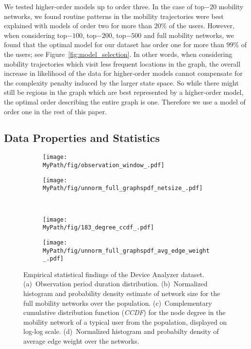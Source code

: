 We tested higher-order models up to order three.
In the case of top$-20$ mobility networks, we found routine patterns in the mobility trajectories were best explained with models of order two for more than 20$\%$ of the users.
However, when considering top$-100$, top$-200$, top$-500$ and full mobility networks, we found that the optimal model for our dataset has order one for more than $ 99\% $ of the users; see Figure~\ref{fig:model_selection}.
In other words, when considering mobility trajectories which visit less frequent locations in the graph, the overall increase in likelihood of the data for higher-order models cannot compensate for the complexity penalty induced by the larger state space.
So while there might still be regions in the graph which are best represented by a higher-order model, the optimal order describing the entire graph is one.
Therefore we use a model of order one in the rest of this paper.




\subsection{Data Properties and Statistics \label{sec:data-stats}}

\begin{figure*}[!t]
	\centering
	\begin{subfigure}[!t]{0.47\textwidth}
		\centering		\texttt{[image: \\MyPath/fig/observation\_window\_.pdf]}
		\caption{}
		\label{fig:num_of_days}
	\end{subfigure}%
	\begin{subfigure}[!t]{.47\textwidth}
		\centering
		\texttt{[image: \\MyPath/fig/unnorm\_full\_graphspdf\_netsize\_.pdf]}
		\caption{}
		\label{fig:sizes}
	\end{subfigure}%
	\\
	\begin{subfigure}[!t]{0.47\textwidth}
		\centering
		\texttt{[image: \\MyPath/fig/183\_degree\_ccdf\_.pdf]}
		\caption{}
		\label{fig:ccdf}
	\end{subfigure}
	\begin{subfigure}[!t]{0.47\textwidth}
		\centering
		\texttt{[image: \\MyPath/fig/unnorm\_full\_graphspdf\_avg\_edge\_weight\_.pdf]}
		\caption{}
		\label{fig:avg_edge_weight}
	\end{subfigure}
	\caption{Empirical statistical findings of the Device Analyzer dataset. (a)~Observation period duration distribution. (b)~Normalized histogram and probability density estimate of network size for the full mobility networks over the population. (c)~Complementary cumulative distribution function (\emph{CCDF}) for the node degree in the mobility network of a typical user from the population, displayed on  log-log scale. (d)~Normalized histogram and probabilty density of average edge weight over the networks.}
	\label{fig:eda}
\end{figure*}

